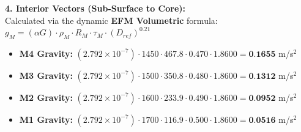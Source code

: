\documentclass[11pt, a4paper]{article}
\begin{document}
  \vspace{0.5em}
  \noindent \textbf{4. Interior Vectors (Sub-Surface to Core):} \\[0.5em]
  \hspace*{1em} Calculated via the dynamic \textbf{EFM Volumetric} formula: $g_M = (\alpha G) \cdot \rho_{M} \cdot R_M \cdot \tau_M \cdot (D_{ref})^{0.21}$
  \begin{itemize}
    \item \textbf{M4 Gravity:} $(2.792 \times 10^{-7}) \cdot 1450 \cdot 467.8 \cdot 0.470 \cdot 1.8600 = \textbf{0.1655}$ m/s$^2$
    \item \textbf{M3 Gravity:} $(2.792 \times 10^{-7}) \cdot 1500 \cdot 350.8 \cdot 0.480 \cdot 1.8600 = \textbf{0.1312}$ m/s$^2$
    \item \textbf{M2 Gravity:} $(2.792 \times 10^{-7}) \cdot 1600 \cdot 233.9 \cdot 0.490 \cdot 1.8600 = \textbf{0.0952}$ m/s$^2$
    \item \textbf{M1 Gravity:} $(2.792 \times 10^{-7}) \cdot 1700 \cdot 116.9 \cdot 0.500 \cdot 1.8600 = \textbf{0.0516}$ m/s$^2$
  \end{itemize}
\end{document}
